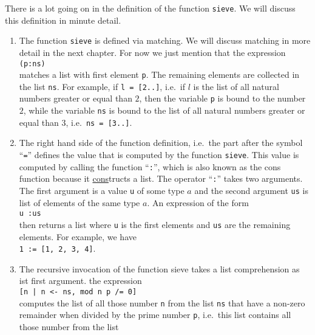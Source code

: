 \documentclass[11pt]{report}
\newcommand{\blue}[1]{{\color{blue}#1}}
\begin{document}
\begin{enumerate}[(a)]
  There is a lot going on in the definition of the function \texttt{sieve}.  We will discuss this definition
  in minute detail.
  \begin{enumerate}[1.]
  \item The function \texttt{sieve} is defined via \blue{matching}.  We will discuss matching in more detail in
    the next chapter.  For now we just mention that the expression
    \\[0.2cm]
    \hspace*{1.3cm}
    \texttt{(p:ns)}
    \\[0.2cm]
    matches a list with first element \texttt{p}.  The remaining elements are collected in the list
    \texttt{ns}.  For example, if \texttt{l = [2..]}, i.e.~if $l$ is the list of all natural numbers greater or
    equal than $2$, then the variable \texttt{p} is bound to the number $2$, while the variable \texttt{ns} is
    bound to the list of all natural numbers greater or equal than $3$, i.e.~\texttt{ns = [3..]}.
  \item The right hand side of the function definition, i.e.~the part after the symbol ``\texttt{=}'' defines the
    value that is computed by the function \texttt{sieve}.  This value is computed by calling the function
    ``\texttt{:}'', which is also known as the \blue{cons} function because it \underline{cons}tructs a list.
    The operator ``\texttt{:}'' takes two arguments.  The first argument is a value \texttt{u} of some type $a$
    and the second argument \texttt{us} is list of elements of the same type $a$.  An expression of the form
    \\[0.2cm]
    \hspace*{1.3cm}
    \texttt{u :\;us}
    \\[0.2cm]
    then returns a list where \texttt{u} is the first elements and \texttt{us} are the remaining elements.
    For example, we have
    \\[0.2cm]
    \hspace*{1.3cm}
    \texttt{1 :\;[2, 3, 4] = [1, 2, 3, 4]}.
  \item The recursive invocation of the function sieve takes a \blue{list comprehension} as ist first argument.
    the expression
    \\[0.2cm]
    \hspace*{1.3cm}
    \texttt{[n | n <- ns, mod n p /= 0]}
    \\[0.2cm]
    computes the list of all those number \texttt{n} from the list \texttt{ns} that have a non-zero remainder
    when divided by the prime number \texttt{p}, i.e.~this list contains all those number from the list

\end{enumerate}
\end{enumerate}
\end{document}
